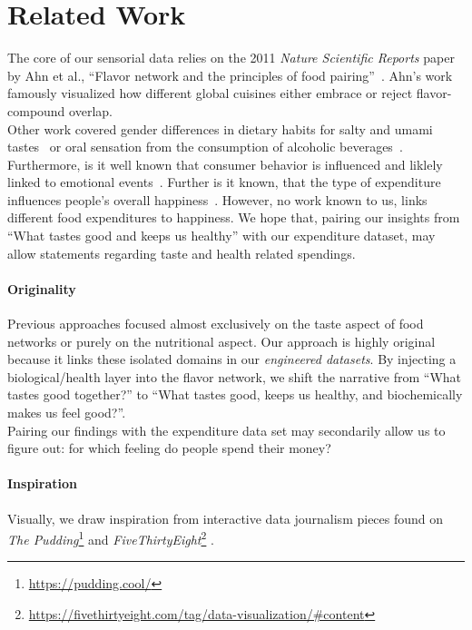 \documentclass{article}
\newcommand{\thepuddingfootnote}[0]{\footnote{\url{https://pudding.cool/}}{} }
\newcommand{\fivethiryeightfootnote}[0]{\footnote{\url{https://fivethirtyeight.com/tag/data-visualization/\#content}}{} }
\begin{document}
\newpage

\section{Related Work}
The core of our sensorial data relies on the 2011 \textit{Nature Scientific Reports} paper by Ahn et al., \enquote{Flavor network and the principles of food pairing}~\cite{ahn2011flavor}. Ahn's work famously visualized how different global cuisines either embrace or reject flavor-compound overlap. \\
Other work covered gender differences in dietary habits for salty and umami tastes~\cite{CATTANEO2025100970} or oral sensation from the consumption of alcoholic beverages~\cite{foods9081131}. \\
Furthermore, is it well known that consumer behavior is influenced and liklely linked to emotional events~\cite{CAI2026107357, khan2025stress}. Further is it known, that the type of expenditure influences people's overall happiness~\cite{stenlund2024spending}. However, no work known to us, links different food expenditures to happiness. We hope that, pairing our insights from \enquote{What tastes good and keeps us healthy} with our expenditure dataset, may allow statements regarding taste and health related spendings.

\paragraph{Originality}
Previous approaches focused almost exclusively on the taste aspect of food networks or purely on the nutritional aspect. Our approach is highly original because it links these isolated domains in our \textit{engineered datasets}. By injecting a biological/health layer into the flavor network, we shift the narrative from \enquote{What tastes good together?} to \enquote{What tastes good, keeps us healthy, and biochemically makes us feel good?}. \\
Pairing our findings with the expenditure data set may secondarily allow us to figure out: for which feeling do people spend their money?

\paragraph{Inspiration}
Visually, we draw inspiration from interactive data journalism pieces found on \textit{The Pudding}\thepuddingfootnote and \textit{FiveThirtyEight}\fivethiryeightfootnote.

\newpage



\end{document}
